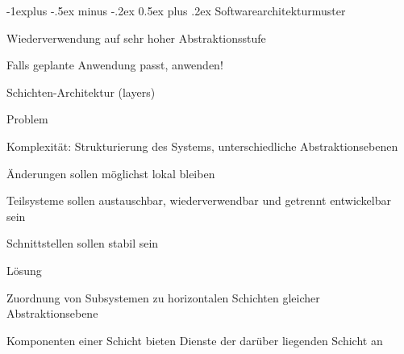 \documentclass[a4paper]{article}
\makeatletter
\renewcommand{\subsection}{\@startsection{subsection}{2}{0mm}%
                                {-1explus -.5ex minus -.2ex}%
                                {0.5ex plus .2ex}%
                                {\normalfont\normalsize\bfseries}}
\makeatother
\begin{document}
\begin{multicols}{3}
  \subsection{Softwarearchitekturmuster}
  \begin{itemize*}
    \item Wiederverwendung auf sehr hoher Abstraktionsstufe
    \item Falls geplante Anwendung passt, anwenden!
  \end{itemize*}

  Schichten-Architektur (layers)
  \begin{itemize*}
    \item Problem
    \begin{itemize*}
      \item Komplexität: Strukturierung des Systems, unterschiedliche Abstraktionsebenen
      \item Änderungen sollen möglichst lokal bleiben
      \item Teilsysteme sollen austauschbar, wiederverwendbar und getrennt entwickelbar sein
      \item Schnittstellen sollen stabil sein
    \end{itemize*}
    \item Lösung
    \begin{itemize*}
      \item Zuordnung von Subsystemen zu horizontalen Schichten gleicher Abstraktionsebene
      \item Komponenten einer Schicht bieten Dienste der darüber liegenden Schicht an
    \end{itemize*}
  \end{itemize*}


\end{multicols}
\end{document}
